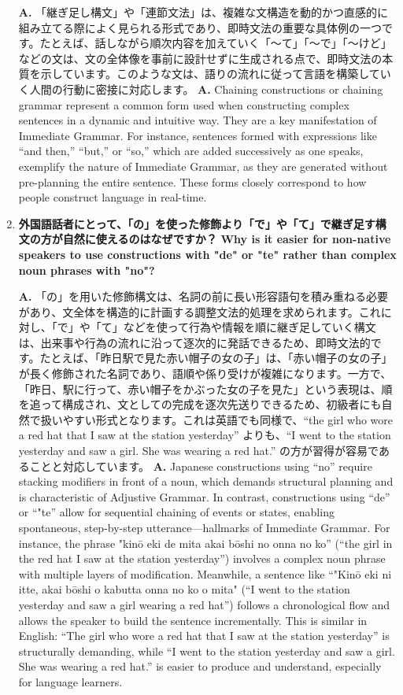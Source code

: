 \begin{enumerate}[resume, label=\textbf{Q\arabic*.}, leftmargin=2em]
\ifJPN
  \textbf{A.} 「継ぎ足し構文」や「連節文法」は、複雑な文構造を動的かつ直感的に組み立てる際によく見られる形式であり、即時文法の重要な具体例の一つです。たとえば、話しながら順次内容を加えていく「〜て」「〜で」「〜けど」などの文は、文の全体像を事前に設計せずに生成される点で、即時文法の本質を示しています。このような文は、語りの流れに従って言語を構築していく人間の行動に密接に対応します。
\else
  \textbf{A.} Chaining constructions or chaining grammar represent a common form used when constructing complex sentences in a dynamic and intuitive way. They are a key manifestation of Immediate Grammar. For instance, sentences formed with expressions like “and then,” “but,” or “so,” which are added successively as one speaks, exemplify the nature of Immediate Grammar, as they are generated without pre-planning the entire sentence. These forms closely correspond to how people construct language in real-time.
\fi


\item \label{qa:20250413b}
\ifJPN
  \textbf{外国語話者にとって、「の」を使った修飾より「で」や「て」で継ぎ足す構文の方が自然に使えるのはなぜですか？}
\else
  \textbf{Why is it easier for non-native speakers to use constructions with "de" or "te" rather than complex noun phrases with "no"?}
\fi

\ifJPN
  \textbf{A.} 「の」を用いた修飾構文は、名詞の前に長い形容語句を積み重ねる必要があり、文全体を構造的に計画する調整文法的処理を求められます。これに対し、「で」や「て」などを使って行為や情報を順に継ぎ足していく構文は、出来事や行為の流れに沿って逐次的に発話できるため、即時文法的です。たとえば、「昨日駅で見た赤い帽子の女の子」は、「赤い帽子の女の子」が長く修飾された名詞であり、語順や係り受けが複雑になります。一方で、「昨日、駅に行って、赤い帽子をかぶった女の子を見た」という表現は、順を追って構成され、文としての完成を逐次先送りできるため、初級者にも自然で扱いやすい形式となります。これは英語でも同様で、``the girl who wore a red hat that I saw at the station yesterday'' よりも、``I went to the station yesterday and saw a girl. She was wearing a red hat.'' の方が習得が容易であることと対応しています。
\else
  \textbf{A.} Japanese constructions using ``no'' require stacking modifiers in front of a noun, which demands structural planning and is characteristic of Adjustive Grammar. In contrast, constructions using ``de'' or ``"te'' allow for sequential chaining of events or states, enabling spontaneous, step-by-step utterance—hallmarks of Immediate Grammar. For instance, the phrase "kinō eki de mita akai bōshi no onna no ko'' (``the girl in the red hat I saw at the station yesterday'') involves a complex noun phrase with multiple layers of modification. Meanwhile, a sentence like ``"Kinō eki ni itte, akai bōshi o kabutta onna no ko o mita" (``I went to the station yesterday and saw a girl wearing a red hat'') follows a chronological flow and allows the speaker to build the sentence incrementally. This is similar in English: ``The girl who wore a red hat that I saw at the station yesterday'' is structurally demanding, while ``I went to the station yesterday and saw a girl. She was wearing a red hat.'' is easier to produce and understand, especially for language learners.
\fi
\end{enumerate}

